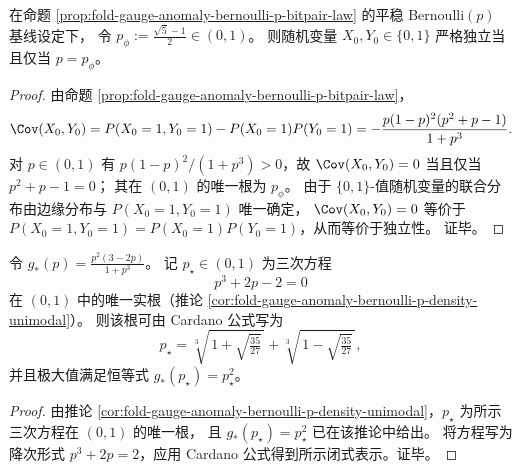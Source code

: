 
\begin{corollary}\label{cor:fold-gauge-anomaly-bernoulli-p-bitpair-independence-threshold}
在命题 \ref{prop:fold-gauge-anomaly-bernoulli-p-bitpair-law} 的平稳 Bernoulli\((p)\) 基线设定下，
令 \(p_\phi:=\frac{\sqrt5-1}{2}\in(0,1)\)。
则随机变量 \(X_0,Y_0\in\{0,1\}\) 严格独立当且仅当 \(p=p_\phi\)。
\end{corollary}
\begin{proof}
由命题 \ref{prop:fold-gauge-anomaly-bernoulli-p-bitpair-law}，
\[
\Cov(X_0,Y_0)
=P(X_0=1,Y_0=1)-P(X_0=1)P(Y_0=1)
=-\frac{p(1-p)^2(p^2+p-1)}{1+p^3}.
\]
对 \(p\in(0,1)\) 有 \(p(1-p)^2/(1+p^3)>0\)，故 \(\Cov(X_0,Y_0)=0\) 当且仅当 \(p^2+p-1=0\)；
其在 \((0,1)\) 的唯一根为 \(p_\phi\)。
由于 \(\{0,1\}\)-值随机变量的联合分布由边缘分布与 \(P(X_0=1,Y_0=1)\) 唯一确定，
\(\Cov(X_0,Y_0)=0\) 等价于 \(P(X_0=1,Y_0=1)=P(X_0=1)P(Y_0=1)\)，从而等价于独立性。
证毕。
\end{proof}

\begin{corollary}\label{cor:fold-gauge-anomaly-bernoulli-p-density-maximizer-cardano}
令 \(g_\ast(p)=\frac{p^2(3-2p)}{1+p^3}\)。
记 \(p_\star\in(0,1)\) 为三次方程
\[
p^3+2p-2=0
\]
在 \((0,1)\) 中的唯一实根（推论 \ref{cor:fold-gauge-anomaly-bernoulli-p-density-unimodal}）。
则该根可由 Cardano 公式写为
\[
p_\star=\sqrt[3]{\,1+\sqrt{\tfrac{35}{27}}\,}+\sqrt[3]{\,1-\sqrt{\tfrac{35}{27}}\,},
\]
并且极大值满足恒等式 \(g_\ast(p_\star)=p_\star^2\)。
\end{corollary}
\begin{proof}
由推论 \ref{cor:fold-gauge-anomaly-bernoulli-p-density-unimodal}，\(p_\star\) 为所示三次方程在 \((0,1)\) 的唯一根，
且 \(g_\ast(p_\star)=p_\star^2\) 已在该推论中给出。
将方程写为降次形式 \(p^3+2p=2\)，应用 Cardano 公式得到所示闭式表示。证毕。
\end{proof}

\endinput

